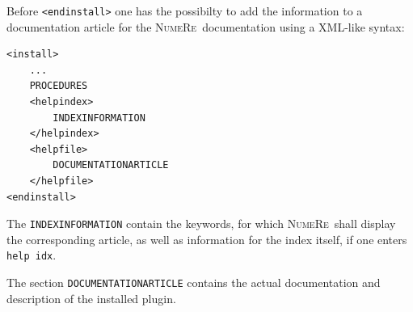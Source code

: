 \documentclass[DIV=14,headsepline,footsepline]{scrbook}
\newcommand{\NR}{\textsc{Nu\-me\-Re}}
\begin{document}
				Before \lstinline+<endinstall>+ one has the possibilty to add the information to a documentation article for the \NR\ documentation using a XML-like syntax:
				\begin{lstlisting}
<install>
	...
	PROCEDURES
	<helpindex>
		INDEXINFORMATION
	</helpindex>
	<helpfile>
		DOCUMENTATIONARTICLE
	</helpfile>
<endinstall>
				\end{lstlisting}
				The \lstinline+INDEXINFORMATION+ contain the keywords, for which \NR\ shall display the corresponding article, as well as information for the index itself, if one enters \lstinline+help idx+.
				
				The section \lstinline+DOCUMENTATIONARTICLE+ contains the actual documentation and description of the installed plugin.
				
\end{document}
